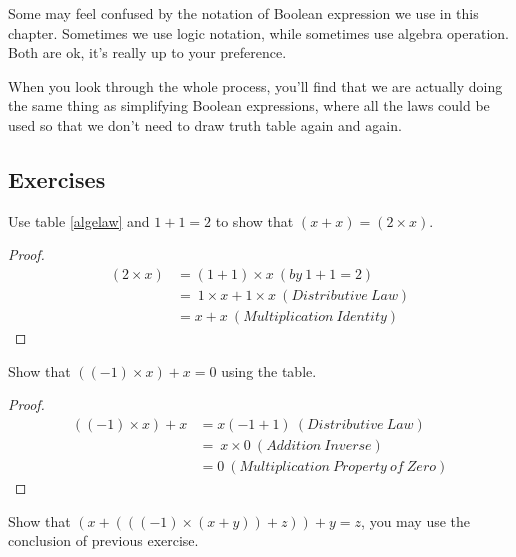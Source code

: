         \begin{remark}
            Some may feel confused by the notation of Boolean expression we use in this chapter.
            Sometimes we use logic notation, while sometimes use algebra operation. Both are ok,
            it's really up to your preference.
        \end{remark}
        When you look through the whole process, you'll find that we are actually doing the same
        thing as simplifying Boolean expressions, where all the laws could be used so that we don't
        need to draw truth table again and again.

        




        \subsection{Exercises}
        \begin{exercise}
            Use table \ref{algelaw} and $1+1=2$ to show that $(x+x)=(2\times x)$.
        \end{exercise}
        \begin{proof}
            \begin{align*}
                ( 2\times x) & =( 1+1) \times x\ ( by\ 1+1=2)\\
                & =\ 1\times x+1\times x\ ( Distributive\ Law)\\
                & =x+x\ ( Multiplication\ Identity)
            \end{align*}
        \end{proof}
        \begin{exercise}
            Show that $((-1)\times x)+x=0$ using the table.
        \end{exercise}
        \begin{proof}
            \begin{align*}
                (( -1) \times x) +x & =x( -1+1) \ ( Distributive\ Law)\\
                 & =\ x\times 0\ ( Addition\ Inverse)\\
                 & =0\ ( Multiplication\ Property\ of\ Zero)
            \end{align*}
        \end{proof}
        \begin{exercise}
            Show that $(x+(((-1)\times (x+y))+z)) + y =z$, you may use the conclusion of previous
            exercise.
        \end{exercise}
